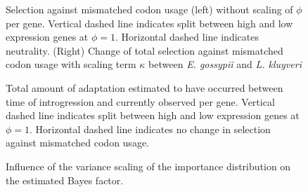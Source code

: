 \documentclass{bmcart}
\def\texttt{[image: ]}
\newcommand{\kluyveri}{\textit{L. kluyveri}\xspace}
\newcommand{\gossypii}{\textit{E. gossypii}\xspace}
\begin{document}
\begin{backmatter}
\begin{figure}
    \centering
    \begin{subfigure}
        \centering
    \end{subfigure}
    \begin{subfigure}
        \centering
    \end{subfigure}
    \caption{Selection against mismatched codon usage (left) without scaling of $\phi$ per gene. 
    Vertical dashed line indicates split between high and low expression genes at $\phi = 1$.
    Horizontal dashed line indicates neutrality.
     (Right) Change of total selection against mismatched codon usage with scaling term $\kappa$ between \gossypii and \kluyveri}
    \label{fig:sne_scaling}
\end{figure}
\null
\vfill
\clearpage
\null
\vfill
\begin{figure}
     \centering
	\caption{Total amount of adaptation estimated to have occurred between time of introgression and currently observed per gene.
	    Vertical dashed line indicates split between high and low expression genes at $\phi = 1$.
	    Horizontal dashed line indicates no change in selection against mismatched codon usage.}
	\label{fig:adapt_tot}
\end{figure}
\null
\vfill
\clearpage
\null
\vfill
\begin{figure}
     \centering
	\caption{Influence of the variance scaling of the importance distribution on the estimated Bayes factor.}
	\label{fig:bf_scaling}
\end{figure}
\null
\vfill
\clearpage


\end{backmatter}
\end{document}
